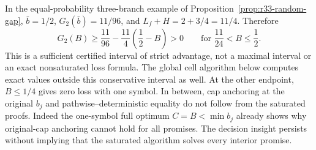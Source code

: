 In the equal-probability three-branch example of Proposition~\ref{prop:r33-random-gap}, $\bar b=1/2$, $G_2(\bar b)=11/96$, and $L_f+H=2+3/4=11/4$. Therefore
\begin{equation}\label{eq:robust-interval}
 G_2(B)\geq\frac{11}{96}-\frac{11}{4}\left(\frac12-B\right)>0
 \qquad\text{for }\frac{11}{24}<B\leq\frac12.
\end{equation}
This is a sufficient certified interval of strict advantage, not a maximal interval or an exact nonsaturated loss formula. The global cell algorithm below computes exact values outside this conservative interval as well. At the other endpoint, $B\leq1/4$ gives zero loss with one symbol. In between, cap anchoring at the original $b_j$ and pathwise--deterministic equality do not follow from the saturated proofs. Indeed the one-symbol full optimum $C=B<\min b_j$ already shows why original-cap anchoring cannot hold for all promises. The decision insight persists without implying that the saturated algorithm solves every interior promise.


